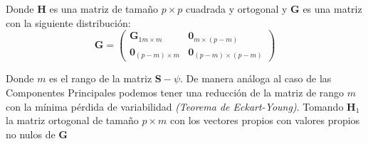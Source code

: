 \noindent Donde $\textbf{H}$ es una matriz de tamaño $p\times p$ cuadrada y ortogonal y $\textbf{G}$ es una matriz con la siguiente distribución:
\begin{equation}
\textbf{G}=\left(
\begin{matrix}
\textbf{G}_{1 m\times m} & \mathbf{0}_{m\times(p-m)}\\
\mathbf{0}_{(p-m)\times m} & \mathbf{0}_{(p-m)\times(p-m)}
\end{matrix}
\right)
\end{equation}

\noindent Donde $m$ es el rango de la matriz $\textbf{S}-\psi$. De manera análoga al caso de las Componentes Principales podemos tener una reducción de la matriz de rango $m$ con la mínima pérdida de variabilidad \emph{(Teorema de Eckart-Young)}. Tomando $\textbf{H}_1$ la matriz ortogonal de tamaño $p \times m$ con los vectores propios con valores propios no nulos de $\textbf{G}$

\begin{propo}
\end{propo}
















